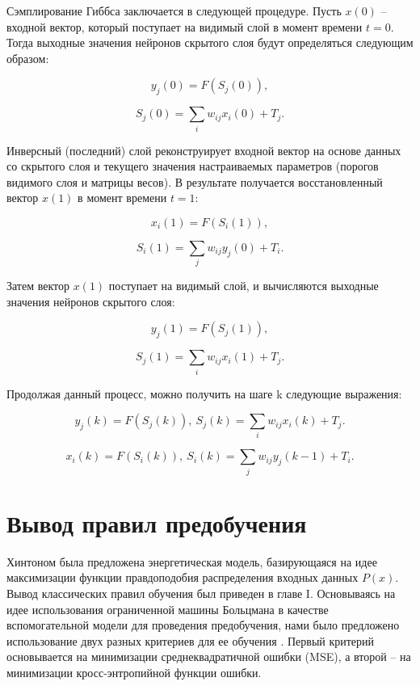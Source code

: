 Сэмплирование Гиббса заключается в следующей процедуре. Пусть $x(0)$ -- входной вектор, который поступает на видимый слой в момент времени $t=0$. Тогда выходные значения нейронов скрытого слоя будут определяться следующим образом:

\begin{equation}
    y_j(0)=F(S_j(0)),
\end{equation}

\begin{equation}
    S_j(0)=\sum_i w_{ij}x_i(0)+T_j.
\end{equation}

Инверсный (последний) слой  реконструирует входной вектор на основе данных со скрытого слоя и текущего значения настраиваемых параметров (порогов видимого слоя и матрицы весов). В результате получается восстановленный вектор $x(1)$ в момент времени $t=1$:

\begin{equation}
    x_i(1)=F(S_i(1)),
\end{equation}

\begin{equation}
    S_i(1)=\sum_j w_{ij}y_j(0)+T_i.
\end{equation}

Затем вектор $x(1)$ поступает на видимый слой, и вычисляются выходные значения нейронов скрытого слоя: 

\begin{equation}
    y_j(1)=F(S_j(1)),
\end{equation}

\begin{equation}
    S_j(1)=\sum_i w_{ij}x_i(1)+T_j.
\end{equation}

Продолжая данный процесс, можно получить на шаге k следующие выражения:

\begin{equation*}		
    y_j(k)=F(S_j(k)),\ S_j(k)=\sum_i w_{ij}x_i(k)+T_j.
\end{equation*}

\begin{equation*}		
    x_i(k)=F(S_i(k)),\ S_i(k)=\sum_j w_{ij}y_j(k-1)+T_i.
\end{equation*}

\section{Вывод правил предобучения} 

Хинтоном была предложена энергетическая модель, базирующаяся на идее максимизации функции правдоподобия распределения входных данных $P(x)$. Вывод классических правил обучения был приведен в главе I. Основываясь на идее использования ограниченной машины Больцмана в качестве вспомогательной модели для проведения предобучения, нами было предложено использование двух разных критериев для ее обучения \cite{4-A}. Первый критерий основывается на минимизации среднеквадратичной ошибки (MSE), а второй -- на минимизации кросс-энтропийной функции ошибки.

